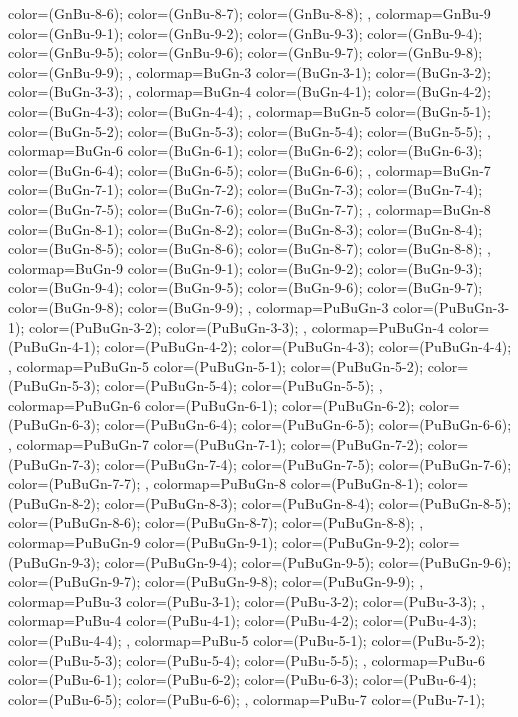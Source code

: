 {{color=(GnBu-8-6);
color=(GnBu-8-7);
color=(GnBu-8-8);
},
colormap={GnBu-9}{
color=(GnBu-9-1);
color=(GnBu-9-2);
color=(GnBu-9-3);
color=(GnBu-9-4);
color=(GnBu-9-5);
color=(GnBu-9-6);
color=(GnBu-9-7);
color=(GnBu-9-8);
color=(GnBu-9-9);
},
colormap={BuGn-3}{
color=(BuGn-3-1);
color=(BuGn-3-2);
color=(BuGn-3-3);
},
colormap={BuGn-4}{
color=(BuGn-4-1);
color=(BuGn-4-2);
color=(BuGn-4-3);
color=(BuGn-4-4);
},
colormap={BuGn-5}{
color=(BuGn-5-1);
color=(BuGn-5-2);
color=(BuGn-5-3);
color=(BuGn-5-4);
color=(BuGn-5-5);
},
colormap={BuGn-6}{
color=(BuGn-6-1);
color=(BuGn-6-2);
color=(BuGn-6-3);
color=(BuGn-6-4);
color=(BuGn-6-5);
color=(BuGn-6-6);
},
colormap={BuGn-7}{
color=(BuGn-7-1);
color=(BuGn-7-2);
color=(BuGn-7-3);
color=(BuGn-7-4);
color=(BuGn-7-5);
color=(BuGn-7-6);
color=(BuGn-7-7);
},
colormap={BuGn-8}{
color=(BuGn-8-1);
color=(BuGn-8-2);
color=(BuGn-8-3);
color=(BuGn-8-4);
color=(BuGn-8-5);
color=(BuGn-8-6);
color=(BuGn-8-7);
color=(BuGn-8-8);
},
colormap={BuGn-9}{
color=(BuGn-9-1);
color=(BuGn-9-2);
color=(BuGn-9-3);
color=(BuGn-9-4);
color=(BuGn-9-5);
color=(BuGn-9-6);
color=(BuGn-9-7);
color=(BuGn-9-8);
color=(BuGn-9-9);
},
colormap={PuBuGn-3}{
color=(PuBuGn-3-1);
color=(PuBuGn-3-2);
color=(PuBuGn-3-3);
},
colormap={PuBuGn-4}{
color=(PuBuGn-4-1);
color=(PuBuGn-4-2);
color=(PuBuGn-4-3);
color=(PuBuGn-4-4);
},
colormap={PuBuGn-5}{
color=(PuBuGn-5-1);
color=(PuBuGn-5-2);
color=(PuBuGn-5-3);
color=(PuBuGn-5-4);
color=(PuBuGn-5-5);
},
colormap={PuBuGn-6}{
color=(PuBuGn-6-1);
color=(PuBuGn-6-2);
color=(PuBuGn-6-3);
color=(PuBuGn-6-4);
color=(PuBuGn-6-5);
color=(PuBuGn-6-6);
},
colormap={PuBuGn-7}{
color=(PuBuGn-7-1);
color=(PuBuGn-7-2);
color=(PuBuGn-7-3);
color=(PuBuGn-7-4);
color=(PuBuGn-7-5);
color=(PuBuGn-7-6);
color=(PuBuGn-7-7);
},
colormap={PuBuGn-8}{
color=(PuBuGn-8-1);
color=(PuBuGn-8-2);
color=(PuBuGn-8-3);
color=(PuBuGn-8-4);
color=(PuBuGn-8-5);
color=(PuBuGn-8-6);
color=(PuBuGn-8-7);
color=(PuBuGn-8-8);
},
colormap={PuBuGn-9}{
color=(PuBuGn-9-1);
color=(PuBuGn-9-2);
color=(PuBuGn-9-3);
color=(PuBuGn-9-4);
color=(PuBuGn-9-5);
color=(PuBuGn-9-6);
color=(PuBuGn-9-7);
color=(PuBuGn-9-8);
color=(PuBuGn-9-9);
},
colormap={PuBu-3}{
color=(PuBu-3-1);
color=(PuBu-3-2);
color=(PuBu-3-3);
},
colormap={PuBu-4}{
color=(PuBu-4-1);
color=(PuBu-4-2);
color=(PuBu-4-3);
color=(PuBu-4-4);
},
colormap={PuBu-5}{
color=(PuBu-5-1);
color=(PuBu-5-2);
color=(PuBu-5-3);
color=(PuBu-5-4);
color=(PuBu-5-5);
},
colormap={PuBu-6}{
color=(PuBu-6-1);
color=(PuBu-6-2);
color=(PuBu-6-3);
color=(PuBu-6-4);
color=(PuBu-6-5);
color=(PuBu-6-6);
},
colormap={PuBu-7}{
color=(PuBu-7-1);
}}

